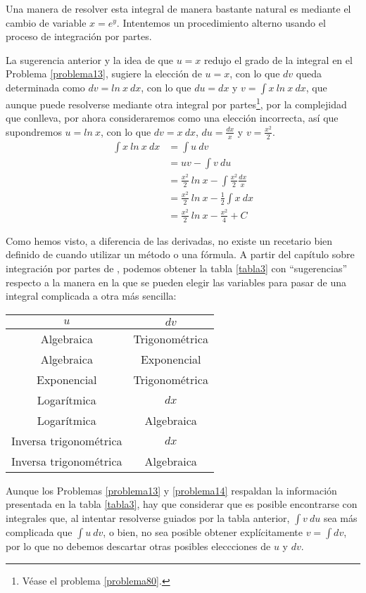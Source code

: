\begin{problema}[$\int\:x\:ln\:x$]\label{problema14}
	Una manera de resolver esta integral de manera bastante natural es mediante el cambio de variable $x=e^y$. Intentemos un procedimiento alterno usando el proceso de integración por partes.
	
	La sugerencia anterior y la idea de que $u=x$ redujo el grado de la integral en el Problema \ref{problema13}, sugiere la elección de $u=x$, con lo que $dv$ queda determinada como $dv=ln\:x\:dx$, con lo que $du=dx$ y $v=\int x\:ln\:x\:dx$, que aunque puede resolverse mediante otra integral por partes\footnote{Véase el problema \ref{problema80}.}, por la complejidad que conlleva, por ahora consideraremos como una elección incorrecta, así que supondremos $u=ln\:x$, con lo que $dv=x\:dx$, $du=\frac{dx}{x}$ y $v=\frac{x^2}{2}$.
	\begin{align*}
		\int x\:ln\:x\:dx&=\int u\:dv\\
					&=uv-\int v\:du\\
					&=\frac{x^2}{2}\:ln\:x-\int \frac{x^2}{2}\frac{dx}{x}\\
					&=\frac{x^2}{2}\:ln\:x-\frac{1}{2}\int x\:dx\\
					&=\frac{x^2}{2}\:ln\:x-\frac{x^2}{4}+C
	\end{align*}
\end{problema}

Como hemos visto, a diferencia de las derivadas, no existe un recetario bien definido de cuando utilizar un método o una fórmula. A partir del capítulo sobre integración por partes de \cite{simplificadas}, podemos obtener la tabla \ref{tabla3} con ``sugerencias'' respecto a la manera en la que se pueden elegir las variables para pasar de una integral complicada a otra más sencilla:
\begin{center}
	\begin{tabular}{|c|c|}
		\hline
		$u$&$dv$\\
		\hline
		Algebraica&Trigonométrica\\
		Algebraica&Exponencial\\
		Exponencial&Trigonométrica\\
		Logarítmica&$dx$\\
		Logarítmica&Algebraica\\
		Inversa trigonométrica&$dx$\\
		Inversa trigonométrica&Algebraica\\
		\hline
	\end{tabular}\label{tabla3}
\end{center}
Aunque los Problemas \ref{problema13} y \ref{problema14} respaldan la información presentada en la tabla \ref{tabla3}, hay que considerar que es posible encontrarse con integrales que, al intentar resolverse guiados por la tabla anterior, $\int v \:du$ sea más complicada que $\int u\:dv$, o bien, no sea posible obtener explícitamente $v=\int dv$, por lo que no debemos descartar otras posibles eleccciones de $u$ y $dv$.


